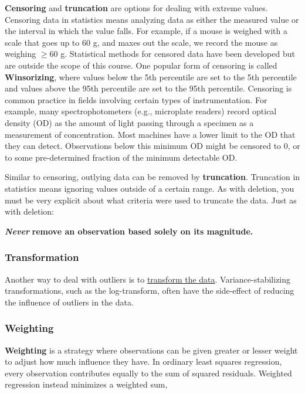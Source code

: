 \documentclass[
  13,
  letterpaper,
]{report}
\begin{document}
\textbf{Censoring} and \textbf{truncation} are options for dealing with
extreme values. Censoring data in statistics means analyzing data as
either the measured value or the interval in which the value falls. For
example, if a mouse is weighed with a scale that goes up to 60 g, and
maxes out the scale, we record the mouse as weighing \(\ge60\) g.
Statistical methods for censored data have been developed but are
outside the scope of this course. One popular form of censoring is
called \textbf{Winsorizing}, where values below the 5th percentile are
set to the 5th percentile and values above the 95th percentile are set
to the 95th percentile. Censoring is common practice in fields involving
certain types of instrumentation. For example, many spectrophotometers
(e.g., microplate readers) record optical density (OD) as the amount of
light passing through a specimen as a measurement of concentration. Most
machines have a lower limit to the OD that they can detect. Observations
below this minimum OD might be censored to 0, or to some pre-determined
fraction of the minimum detectable OD.

Similar to censoring, outlying data can be removed by
\textbf{truncation}. Truncation in statistics means ignoring values
outside of a certain range. As with deletion, you must be very explicit
about what criteria were used to truncate the data. Just as with
deletion:

\textbf{\emph{Never}} \textbf{remove an observation based solely on its
magnitude.}

\subsubsection{Transformation}\label{transformation}

Another way to deal with outliers is to \href{@sec-trans}{transform the
data}. Variance-stabilizing transformations, such as the log-transform,
often have the side-effect of reducing the influence of outliers in the
data.

\subsubsection{Weighting}\label{weighting}

\textbf{Weighting} is a strategy where observations can be given greater
or lesser weight to adjust how much influence they have. In ordinary
least squares regression, every observation contributes equally to the
sum of squared residuals. Weighted regression instead minimizes a
weighted sum,
\end{document}
